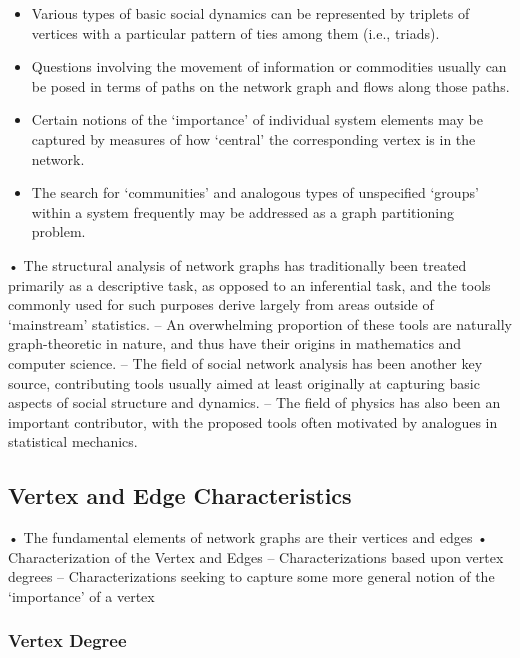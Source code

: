 \documentclass[
]{book}
\providecommand{\tightlist}{%
  \setlength{\itemsep}{0pt}\setlength{\parskip}{0pt}}
\begin{document}
{{{\begin{itemize}
\tightlist
\item
  Various types of basic social dynamics can be represented by triplets of vertices with a particular pattern of ties among them (i.e., triads).
\item
  Questions involving the movement of information or commodities usually can be posed in terms of paths on the network graph and flows along those paths.
\item
  Certain notions of the `importance' of individual system elements may be captured by measures of how `central' the corresponding vertex is in the network.
\item
  The search for `communities' and analogous types of unspecified `groups' within a system frequently may be addressed as a graph partitioning problem.
\end{itemize}

• The structural analysis of network graphs has traditionally been treated primarily as a descriptive task, as opposed to an inferential task, and the tools commonly used for such purposes derive largely from areas outside of `mainstream' statistics.
-- An overwhelming proportion of these tools are naturally graph-theoretic in nature, and thus have their origins in mathematics and computer science.
-- The field of social network analysis has been another key source, contributing tools usually aimed at least originally at capturing basic aspects of social structure and dynamics.
-- The field of physics has also been an important contributor, with the proposed tools often motivated by analogues in statistical mechanics.

\hypertarget{vertex-and-edge-characteristics}{%
\subsection{Vertex and Edge Characteristics}\label{vertex-and-edge-characteristics}}

• The fundamental elements of network graphs are their vertices and edges
• Characterization of the Vertex and Edges
-- Characterizations based upon vertex degrees
-- Characterizations seeking to capture some more general notion of the `importance' of a vertex

\hypertarget{vertex-degree}{%
\subsubsection{Vertex Degree}\label{vertex-degree}}

}}}
\end{document}
